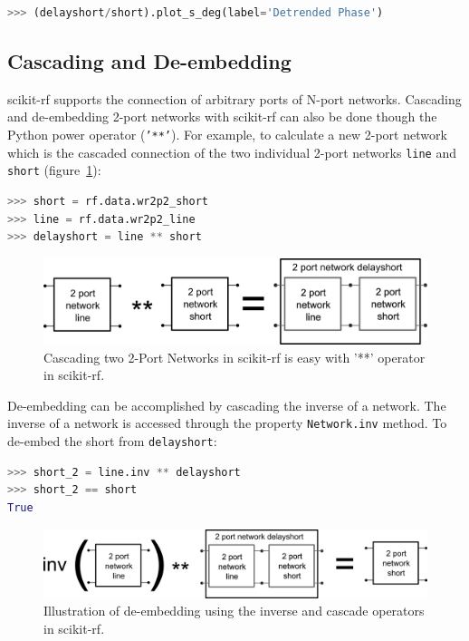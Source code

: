 \documentclass{IEEEjmw}
\begin{document}
\begin{lstlisting}[language=Python]
>>> (delayshort/short).plot_s_deg(label='Detrended Phase')
\end{lstlisting}

\subsection{Cascading and De-embedding}
scikit-rf supports the connection of arbitrary ports of N-port networks. Cascading and de-embedding 2-port networks with scikit-rf can also be done though the Python power operator (\texttt{'**'}). For example, to calculate a new 2-port network which is the cascaded connection of the two individual 2-port networks \texttt{line} and \texttt{short} (figure~\ref{fig:cascading}):

\begin{lstlisting}[language=Python]
>>> short = rf.data.wr2p2_short
>>> line = rf.data.wr2p2_line
>>> delayshort = line ** short
\end{lstlisting}

\begin{figure}
	\centering
	\includegraphics[width=0.95\linewidth]{figures/cascading}
	\caption{Cascading two 2-Port Networks in scikit-rf is easy with '**' operator in scikit-rf.}
	\label{fig:cascading}
\end{figure}

De-embedding can be accomplished by cascading the inverse of a network. The inverse of a network is accessed through the property \texttt{Network.inv} method. To de-embed the short from \texttt{delayshort}:

\begin{lstlisting}[language=Python]
>>> short_2 = line.inv ** delayshort
>>> short_2 == short
True
\end{lstlisting}

\begin{figure}
	\centering
	\includegraphics[width=0.95\linewidth]{figures/deembedding}
	\caption{Illustration of de-embedding using the inverse and cascade operators in scikit-rf.}
	\label{fig:deembedding}
\end{figure}
\end{document}
